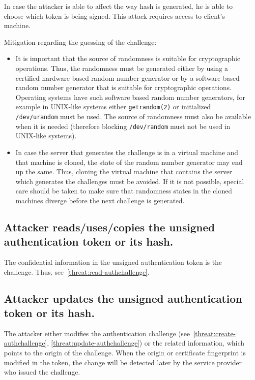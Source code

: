 In case the attacker is able to affect the way hash is generated, he is able to choose which token is being signed. This attack requires access to client's machine. 

Mitigation regarding the guessing of the challenge:
\begin{itemize}
\item It is important that the source of randomness is suitable for cryptographic operations. Thus, the randomness must be generated either by using a certified hardware based random number generator or by a software based random number generator that is suitable for cryptographic operations. Operating systems have such software based random number generators, for example in UNIX-like systems either \texttt{getrandom(2)} or initialized \texttt{/dev/urandom} must be used. The source of randomness must also be available when it is needed (therefore blocking \texttt{/dev/random} must not be used in UNIX-like systems). 

\item In case the server that generates the challenge is in a virtual machine and that machine is cloned, the state of the random number generator may end up the same. Thus, cloning the virtual machine that contains the server which generates the challenges must be avoided. If it is not possible, special care should be taken to make sure that randomness states in the cloned machines diverge before the next challenge is generated.
\end{itemize}



\subsection{Attacker reads/uses/copies the unsigned authentication token or its hash.}
\label{threat:read-authtoken}
The confidential information in the unsigned authentication token is the challenge. Thus, see~\ref{threat:read-authchallenge}. 


\subsection{Attacker updates the unsigned authentication token or its hash.}
\label{threat:update-authtoken}
The attacker either modifies the authentication challenge (see~\ref{threat:create-authchallenge}, \ref{threat:update-authchallenge}) or the related information, which points to the origin of the challenge. When the origin or certificate fingerprint is modified in the token, the change will be detected later by the service provider who issued the challenge.

